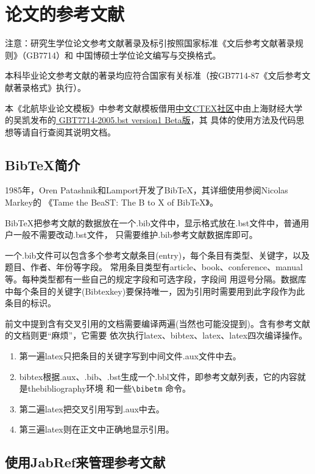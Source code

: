 \chapter{论文的参考文献}
\label{chapter6-reference}
注意：研究生学位论文参考文献著录及标引按照国家标准《文后参考文献著录规则》（GB7714）和
中国博硕士学位论文编写与交换格式。

本科毕业论文参考文献的著录均应符合国家有关标准（按GB7714-87《文后参考文献著录格式》执行）。

本《北航毕业论文\latex{}模板》中参考文献模板借用\href{http://bbs.ctex.org/forum.php}{中文CTEX社区}中由上海财经大学
的吴凯发布的\href{http://bbs.ctex.org/forum.php?mod=viewthread&tid=33591}{ GBT7714-2005.bst version1 Beta版}，其
具体的使用方法及代码思想等请自行查阅其说明文档。
\section{BibTeX简介}
\label{section-bibtex}
1985年，Oren Patashnik和Lamport开发了BibTeX，其详细使用参阅Nicolas Markey的
《Tame the BeaST: The B to X of BibTeX》。

BibTeX把参考文献的数据放在一个.bib文件中，显示格式放在.bst文件中，普通用户一般不需要改动.bst文件，
只需要维护.bib参考文献数据库即可。

一个.bib文件可以包含多个参考文献条目(entry)，每个条目有类型、关键字，以及题目、作者、年份等字段。
常用条目类型有article、book、conference、manual等。每种类型都有一些自己的规定字段和可选字段，字段间
用逗号分隔。数据库中每个条目的关键字(Bibtexkey)要保持唯一，因为引用时需要用到此字段作为此条目的标识。

前文中提到含有交叉引用的文档需要编译两遍(当然也可能没提到)。含有参考文献的文档则更“麻烦”，它需要
依次执行latex、bibtex、latex、latex四次编译操作。
\begin{enumerate}
\item 第一遍latex只把条目的关键字写到中间文件.aux文件中去。
\item bibtex根据.aux、.bib、.bst生成一个.bbl文件，即参考文献列表，它的内容就是thebibliography环境
和一些\verb|\bibetm| 命令。
\item 第二遍latex把交叉引用写到.aux中去。
\item 第三遍latex则在正文中正确地显示引用。
\end{enumerate}

\section{使用JabRef来管理参考文献}
